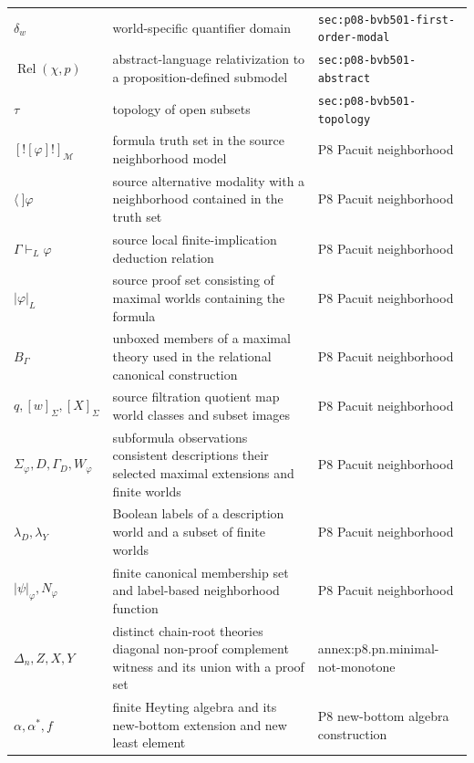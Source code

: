 \begin{longtable}{@{}p{}p{}p{}@{}}
\(\delta_w\) & world-specific quantifier domain & \texttt{sec:\allowbreak{}p08-\allowbreak{}bvb501-\allowbreak{}first-\allowbreak{}order-\allowbreak{}modal} \\
\(\operatorname{Rel}(\chi,\allowbreak p)\) & abstract-language relativization to a proposition-defined submodel & \texttt{sec:\allowbreak{}p08-\allowbreak{}bvb501-\allowbreak{}abstract} \\
\(\tau\) & topology of open subsets & \texttt{sec:\allowbreak{}p08-\allowbreak{}bvb501-\allowbreak{}topology} \\
\([![\varphi]!]_{\mathcal M}\) & formula truth set in the source neighborhood model & P8 Pacuit neighborhood \\
\(\langle\ ]\varphi\) & source alternative modality with a neighborhood contained in the truth set & P8 Pacuit neighborhood \\
\(\Gamma\vdash_L\varphi\) & source local finite-implication deduction relation & P8 Pacuit neighborhood \\
\(|\varphi|_L\) & source proof set consisting of maximal worlds containing the formula & P8 Pacuit neighborhood \\
\(B_\Gamma\) & unboxed members of a maximal theory used in the relational canonical construction & P8 Pacuit neighborhood \\
\(q,\allowbreak [w]_\Sigma,\allowbreak [X]_\Sigma\) & source filtration quotient map world classes and subset images & P8 Pacuit neighborhood \\
\(\Sigma_\varphi,\allowbreak D,\allowbreak \Gamma_D,\allowbreak W_\varphi\) & subformula observations consistent descriptions their selected maximal extensions and finite worlds & P8 Pacuit neighborhood \\
\(\lambda_D,\allowbreak \lambda_Y\) & Boolean labels of a description world and a subset of finite worlds & P8 Pacuit neighborhood \\
\(|\psi|_\varphi,\allowbreak N_\varphi\) & finite canonical membership set and label-based neighborhood function & P8 Pacuit neighborhood \\
\(\Delta_n,\allowbreak Z,\allowbreak X,\allowbreak Y\) & distinct chain-root theories diagonal non-proof complement witness and its union with a proof set & annex:\allowbreak{}p8.\allowbreak{}pn.\allowbreak{}minimal-\allowbreak{}not-\allowbreak{}monotone \\
\(\alpha,\allowbreak \alpha^*,\allowbreak f\) & finite Heyting algebra and its new-bottom extension and new least element & P8 new-\allowbreak{}bottom algebra construction \\

\end{longtable}
